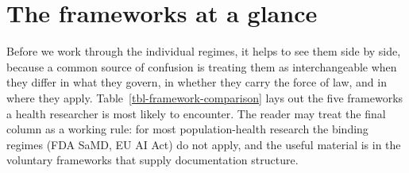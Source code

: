 \documentclass[
  letterpaper,
  11pt]{scrbook}
\begin{document}
\section{The frameworks at a glance}\label{the-frameworks-at-a-glance}

Before we work through the individual regimes, it helps to see them side
by side, because a common source of confusion is treating them as
interchangeable when they differ in what they govern, in whether they
carry the force of law, and in where they apply.
Table~\ref{tbl-framework-comparison} lays out the five frameworks a
health researcher is most likely to encounter. The reader may treat the
final column as a working rule: for most population-health research the
binding regimes (FDA SaMD, EU AI Act) do not apply, and the useful
material is in the voluntary frameworks that supply documentation
structure.
\end{document}

